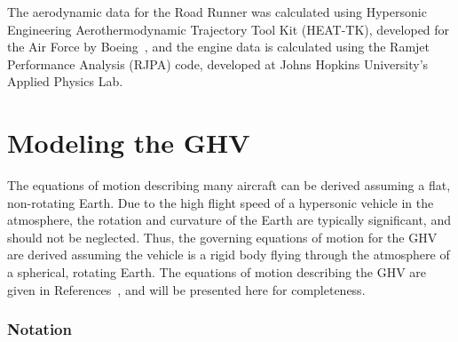 The aerodynamic data for the Road Runner was calculated using Hypersonic Engineering Aerothermodynamic Trajectory Tool Kit (HEAT-TK), developed for the Air Force by Boeing\ \cite{carter.heattk.2005}, and the engine data is calculated using the Ramjet Performance Analysis (RJPA) code, developed at Johns Hopkins University's Applied Physics Lab.

\section{Modeling the GHV}

The equations of motion describing many aircraft can be derived assuming a flat, non-rotating Earth.
Due to the high flight speed of a hypersonic vehicle in the atmosphere, the rotation and curvature of the Earth are typically significant, and should not be neglected.
Thus, the governing equations of motion for the GHV are derived assuming the vehicle is a rigid body flying through the atmosphere of a spherical, rotating Earth.
The equations of motion describing the GHV are given in References\ \cite{etkin.atmosphericflight.1972,billamoria.eom.1995}, and will be presented here for completeness.

\subsubsection*{Notation}

